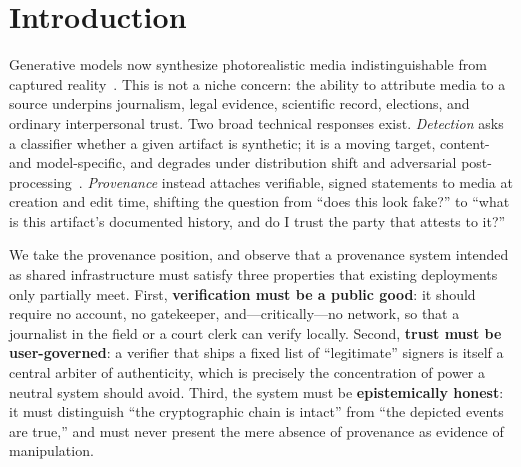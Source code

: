\documentclass[11pt]{article}
\begin{document}
\section{Introduction}
Generative models now synthesize photorealistic media indistinguishable from captured
reality~\cite{rombach2022ldm}. This is not a niche concern: the ability to attribute media
to a source underpins journalism, legal evidence, scientific record, elections, and
ordinary interpersonal trust. Two broad technical responses exist. \emph{Detection} asks a
classifier whether a given artifact is synthetic; it is a moving target, content- and
model-specific, and degrades under distribution shift and adversarial
post-processing~\cite{verdoliva2020media,farid2016photo}. \emph{Provenance} instead attaches
verifiable, signed statements to media at creation and edit time, shifting the question from
``does this look fake?'' to ``what is this artifact's documented history, and do I trust the
party that attests to it?''

We take the provenance position, and observe that a provenance system intended as shared
infrastructure must satisfy three properties that existing deployments only partially meet.
First, \textbf{verification must be a public good}: it should require no account, no
gatekeeper, and---critically---no network, so that a journalist in the field or a court
clerk can verify locally. Second, \textbf{trust must be user-governed}: a verifier that
ships a fixed list of ``legitimate'' signers is itself a central arbiter of authenticity,
which is precisely the concentration of power a neutral system should avoid. Third, the
system must be \textbf{epistemically honest}: it must distinguish ``the cryptographic chain
is intact'' from ``the depicted events are true,'' and must never present the mere absence
of provenance as evidence of manipulation.
\end{document}
